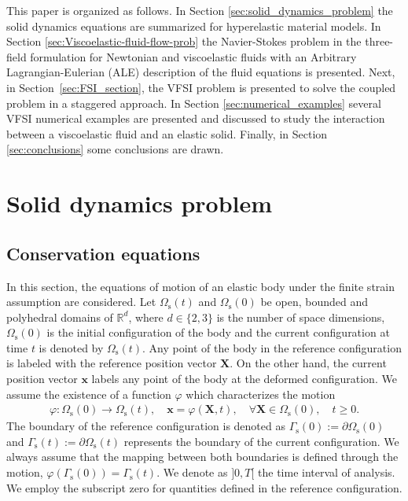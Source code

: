 \documentclass[11pt,english]{article}
\def\x{\boldsymbol{x}}
\begin{document}
This paper is organized as follows. In Section \ref{sec:solid_dynamics_problem} the solid dynamics equations are summarized for hyperelastic material models. In Section \ref{sec:Viscoelastic-fluid-flow-prob} the Navier-Stokes problem in the three-field formulation for Newtonian and viscoelastic fluids with an Arbitrary Lagrangian-Eulerian (ALE) description of the fluid equations is presented. Next, in Section~\ref{sec:FSI_section}, the VFSI problem is presented to solve the coupled problem in a staggered approach. In Section \ref{sec:numerical_examples} several VFSI numerical examples are presented and discussed to study the interaction between a viscoelastic fluid and an elastic solid. Finally, in Section \ref{sec:conclusions} some conclusions are drawn.

%
%

\section{Solid dynamics problem \label{sec:solid_dynamics_problem}}

\subsection{Conservation equations\label{subsec:conservation_equations}} 

In this section, the equations of motion of an elastic body under the finite strain assumption are considered. Let $\Omega_{\mathrm{s}}(t)$ and $\Omega_{\mathrm{s}}(0)$ be open, bounded and polyhedral domains of $\mathbb{R}^{d}$, where $d \in \lbrace 2,3 \rbrace $ is the number of space dimensions, $\Omega_{\mathrm{s}}(0)$ is the initial configuration of the body and the current configuration at time $t$ is denoted by $\Omega_{\mathrm{s}}(t)$. Any point of the body in the reference configuration is labeled with the reference position vector $\boldsymbol{X}$. On the other hand, the current position vector $\x$ labels any point of the body at the deformed configuration. We assume the existence of a function $\varphi$ which characterizes the motion
 \begin{align*}
     \varphi : \Omega_{\mathrm{s}}(0) \longrightarrow \Omega_{\mathrm{s}}(t),\quad 
     \x = \varphi(\boldsymbol{X},t), \quad \forall \boldsymbol{X} \in \Omega_{\mathrm{s}}(0), \quad t \geq 0.
 \end{align*}
The boundary of the reference configuration is denoted as $\Gamma_{\mathrm{s}}(0) := \partial \Omega_{\mathrm{s}}(0)$ and $\Gamma_{\mathrm{s}}(t) := \partial \Omega_{\mathrm{s}}(t)$ represents the boundary of the current configuration. We always assume that the mapping between both boundaries is defined through the motion, $\varphi \left(\Gamma_{\mathrm{s}}(0)\right) = \Gamma_{\mathrm{s}}(t)$. We denote as $]0, T[$ the time interval of analysis. We employ the subscript zero for quantities defined in the reference configuration.
\end{document}
